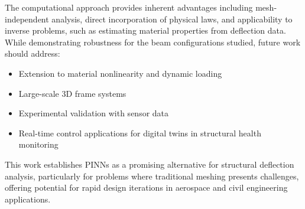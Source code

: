 \documentclass[12pt]{article}
\begin{document}
The computational approach provides inherent advantages including mesh-independent analysis, direct incorporation of physical laws, and applicability to inverse problems, such as estimating material properties from deflection data. While demonstrating robustness for the beam configurations studied, future work should address:

\begin{itemize}
	\item Extension to material nonlinearity and dynamic loading
	\item Large-scale 3D frame systems
	\item Experimental validation with sensor data
	\item Real-time control applications for digital twins in structural health monitoring
\end{itemize}

This work establishes PINNs as a promising alternative for structural deflection analysis, particularly for problems where traditional meshing presents challenges, offering potential for rapid design iterations in aerospace and civil engineering applications.

\pagebreak


\end{document}
